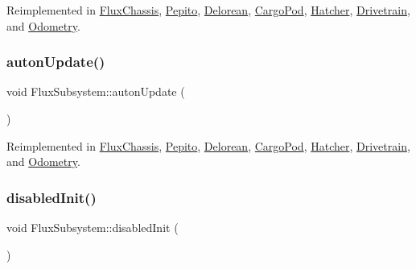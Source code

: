 Reimplemented in \hyperlink{classFluxChassis_acdfad6bb4b5cc6e5c03e8e8ab5879c52}{Flux\+Chassis}, \hyperlink{classPepito_ac9a8b75ef48cd95683733af317618ca4}{Pepito}, \hyperlink{classDelorean_ad06990e5c59d5f4d30b48015e744cc49}{Delorean}, \hyperlink{classCargoPod_a070623c3e9ca5b91765d68b63ccfa1eb}{Cargo\+Pod}, \hyperlink{classHatcher_ac44bea31eb17578106c48914450a1be1}{Hatcher}, \hyperlink{classDrivetrain_a6aec7fa1a9daf1233a59fe0243d3bc8c}{Drivetrain}, and \hyperlink{classOdometry_a0ec037096f65e779248e6a99615f37ed}{Odometry}.

\mbox{\label{classFluxSubsystem_aceed900af22503022b8d1278f3693f77}} 
\subsubsection{\texorpdfstring{auton\+Update()}{autonUpdate()}}
{\footnotesize\ttfamily void Flux\+Subsystem\+::auton\+Update (\begin{DoxyParamCaption}{ }\end{DoxyParamCaption})\hspace{0.3cm}{\ttfamily [virtual]}}



Reimplemented in \hyperlink{classFluxChassis_a2298a26f376a4b7d73da84f33b68642e}{Flux\+Chassis}, \hyperlink{classPepito_a42cc57495399c63940571b113e7140f8}{Pepito}, \hyperlink{classDelorean_a17c9b875c9c0d3c9b9dadd5838bfedfd}{Delorean}, \hyperlink{classCargoPod_ad11b20da5e057212dedd7a5ef34223b9}{Cargo\+Pod}, \hyperlink{classHatcher_a5e21dc019a7f05b4bbbf39545a920f5a}{Hatcher}, \hyperlink{classDrivetrain_ab451b48c598fa715ff1a8117ddc6f705}{Drivetrain}, and \hyperlink{classOdometry_a5a19f4d904e5364ca75a91f97a8777a6}{Odometry}.

\mbox{\label{classFluxSubsystem_aa0b8fde8aa5094627d15d24e545e1da4}} 
\subsubsection{\texorpdfstring{disabled\+Init()}{disabledInit()}}
{\footnotesize\ttfamily void Flux\+Subsystem\+::disabled\+Init (\begin{DoxyParamCaption}{ }\end{DoxyParamCaption})\hspace{0.3cm}{\ttfamily [virtual]}}



